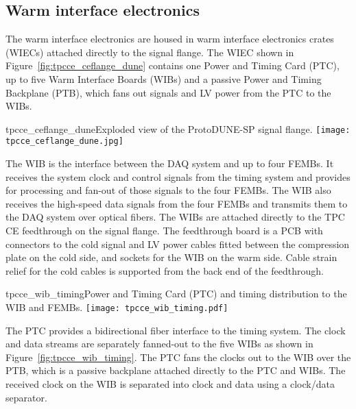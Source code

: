 \subsection{Warm interface electronics}
\label{subsec:warm_interface_elec}

The warm interface electronics are housed in warm interface electronics crates (WIECs)
attached directly to the signal flange.  The WIEC shown in Figure~\ref{fig:tpcce_ceflange_dune} 
contains one
Power and Timing Card (PTC), up to five Warm Interface Boards (WIBs) and a passive
Power and Timing Backplane (PTB), which fans out signals and LV power from the PTC to the WIBs.

\begin{cdrfigure}{tpcce_ceflange_dune}{Exploded view of the ProtoDUNE-SP signal flange.}
\texttt{[image: tpcce\_ceflange\_dune.jpg]}
\end{cdrfigure}

The WIB is the interface between the
DAQ system and up to four
FEMBs. It receives the system clock and control signals from the
timing system and provides for processing and fan-out of those signals to the four
FEMBs. The WIB also receives the high-speed data signals from the four 
FEMBs and transmits them to the DAQ system over optical
fibers.  The WIBs are attached directly to the TPC
CE feedthrough on the signal flange. The feedthrough
board is a PCB with connectors to the cold signal and LV power cables fitted
between the compression plate on the cold side, and sockets for
the WIB on the warm side. Cable strain relief for the cold cables is 
supported from the back end of the feedthrough.



\begin{cdrfigure}{tpcce_wib_timing}{Power and Timing Card (PTC) 
and timing distribution to the WIB and FEMBs.}
\texttt{[image: tpcce\_wib\_timing.pdf]}
\end{cdrfigure}

The PTC provides a bidirectional fiber interface to the
timing system.  The clock and data
streams are separately fanned-out to the five WIBs as shown in
Figure~\ref{fig:tpcce_wib_timing}. The PTC fans the clocks out to the WIB over the
PTB, which is a passive backplane attached directly to the PTC and
WIBs.  The received clock on the WIB is separated into clock and
data using a clock/data separator.

